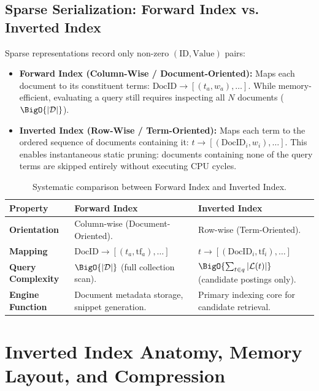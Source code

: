 \subsection{Sparse Serialization: Forward Index vs. Inverted Index}
Sparse representations record only non-zero $(\text{ID}, \text{Value})$ pairs:
\begin{itemize}
    \item \textbf{Forward Index (Column-Wise / Document-Oriented):} Maps each document to its constituent terms: $\text{DocID} \to [(t_a, w_a), \dots]$. While memory-efficient, evaluating a query still requires inspecting all $N$ documents ($\BigO{|\mathcal{D}|}$).
    \item \textbf{Inverted Index (Row-Wise / Term-Oriented):} Maps each term to the ordered sequence of documents containing it: $t \to [(\text{DocID}_i, w_i), \dots]$. This enables instantaneous static pruning: documents containing none of the query terms are skipped entirely without executing CPU cycles.
\end{itemize}

\begin{table}[H]
\centering
\small
\begin{tabularx}{\linewidth}{l X X}
\toprule
\textbf{Property} & \textbf{Forward Index} & \textbf{Inverted Index} \\
\midrule
\textbf{Orientation} & Column-wise (Document-Oriented). & Row-wise (Term-Oriented). \\
\addlinespace
\textbf{Mapping} & $\text{DocID} \to [(t_a, \text{tf}_a), \dots]$ & $t \to [(\text{DocID}_i, \text{tf}_i), \dots]$ \\
\addlinespace
\textbf{Query Complexity} & $\BigO{|\mathcal{D}|}$ (full collection scan). & $\BigO{\sum_{t \in q} |\mathcal{L}(t)|}$ (candidate postings only). \\
\addlinespace
\textbf{Engine Function} & Document metadata storage, snippet generation. & Primary indexing core for candidate retrieval. \\
\bottomrule
\end{tabularx}
\caption{Systematic comparison between Forward Index and Inverted Index.}
\label{tab:fwd-vs-inv-en}
\end{table}

\FloatBarrier
\section{Inverted Index Anatomy, Memory Layout, and Compression}
\label{sec:inverted-index-anatomy-en}

